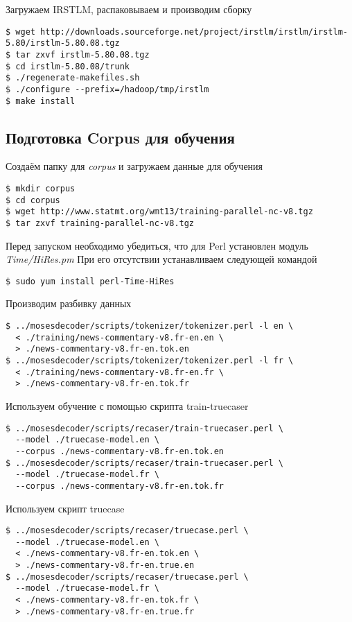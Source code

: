 Загружаем IRSTLM, распаковываем и производим сборку
\begin{lstlisting}
$ wget http://downloads.sourceforge.net/project/irstlm/irstlm/irstlm-5.80/irstlm-5.80.08.tgz
$ tar zxvf irstlm-5.80.08.tgz
$ cd irstlm-5.80.08/trunk
$ ./regenerate-makefiles.sh
$ ./configure --prefix=/hadoop/tmp/irstlm
$ make install
\end{lstlisting}

\subsection{Подготовка Corpus для обучения}
Создаём папку для \emph{corpus} и загружаем данные для обучения
\begin{lstlisting}
$ mkdir corpus
$ cd corpus
$ wget http://www.statmt.org/wmt13/training-parallel-nc-v8.tgz
$ tar zxvf training-parallel-nc-v8.tgz
\end{lstlisting}

Перед запуском необходимо убедиться, что для Perl установлен модуль \emph{Time/HiRes.pm}
При его отсутствии устанавливаем следующей командой
\begin{lstlisting}
$ sudo yum install perl-Time-HiRes
\end{lstlisting}

Производим разбивку данных
\begin{lstlisting}
$ ../mosesdecoder/scripts/tokenizer/tokenizer.perl -l en \
  < ./training/news-commentary-v8.fr-en.en \
  > ./news-commentary-v8.fr-en.tok.en
$ ../mosesdecoder/scripts/tokenizer/tokenizer.perl -l fr \
  < ./training/news-commentary-v8.fr-en.fr \
  > ./news-commentary-v8.fr-en.tok.fr
\end{lstlisting}

Используем обучение с помощью скрипта train-truecaser
\begin{lstlisting}
$ ../mosesdecoder/scripts/recaser/train-truecaser.perl \
  --model ./truecase-model.en \
  --corpus ./news-commentary-v8.fr-en.tok.en
$ ../mosesdecoder/scripts/recaser/train-truecaser.perl \
  --model ./truecase-model.fr \
  --corpus ./news-commentary-v8.fr-en.tok.fr
\end{lstlisting}

Используем скрипт truecase
\begin{lstlisting}
$ ../mosesdecoder/scripts/recaser/truecase.perl \
  --model ./truecase-model.en \
  < ./news-commentary-v8.fr-en.tok.en \
  > ./news-commentary-v8.fr-en.true.en
$ ../mosesdecoder/scripts/recaser/truecase.perl \
  --model ./truecase-model.fr \
  < ./news-commentary-v8.fr-en.tok.fr \
  > ./news-commentary-v8.fr-en.true.fr
\end{lstlisting}

